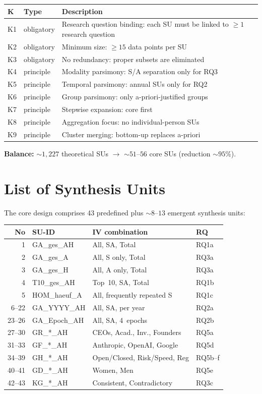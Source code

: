 \documentclass[12pt,a4paper]{article}
\begin{document}
\begin{longtable}{l l p{8cm}}
  \toprule
  \textbf{K} & \textbf{Type} & \textbf{Description} \\
  \midrule
  \endfirsthead
  K1 & obligatory & Research question binding: each SU must be linked to $\geq 1$ research question \\
  K2 & obligatory & Minimum size: $\geq 15$ data points per SU \\
  K3 & obligatory & No redundancy: proper subsets are eliminated \\
  K4 & principle & Modality parsimony: S/A separation only for RQ3 \\
  K5 & principle & Temporal parsimony: annual SUs only for RQ2 \\
  K6 & principle & Group parsimony: only a-priori-justified groups \\
  K7 & principle & Stepwise expansion: core first \\
  K8 & principle & Aggregation focus: no individual-person SUs \\
  K9 & principle & Cluster merging: bottom-up replaces a-priori \\
  \bottomrule
\end{longtable}

\textbf{Balance:} ${\sim}1{,}227$ theoretical SUs $\to$ ${\sim}51$--$56$ core SUs (reduction ${\sim}95$\%).


\section{List of Synthesis Units}
\label{app:se}

The core design comprises 43 predefined plus ${\sim}8$--$13$ emergent synthesis units:

{\small
\begin{longtable}{r l l l}
  \toprule
  \textbf{No} & \textbf{SU-ID} & \textbf{IV combination} & \textbf{RQ} \\
  \midrule
  \endfirsthead
  1 & GA\_ges\_AH & All, SA, Total & RQ1a \\
  2 & GA\_ges\_A & All, S only, Total & RQ3a \\
  3 & GA\_ges\_H & All, A only, Total & RQ3a \\
  4 & T10\_ges\_AH & Top~10, SA, Total & RQ1b \\
  5 & HOM\_haeuf\_A & All, frequently repeated S & RQ1c \\
  6--22 & GA\_YYYY\_AH & All, SA, per year & RQ2a \\
  23--26 & GA\_Epoch\_AH & All, SA, 4~epochs & RQ2b \\
  27--30 & GR\_*\_AH & CEOs, Acad., Inv., Founders & RQ5a \\
  31--33 & GF\_*\_AH & Anthropic, OpenAI, Google & RQ5d \\
  34--39 & GH\_*\_AH & Open/Closed, Risk/Speed, Reg & RQ5b--f \\
  40--41 & GD\_*\_AH & Women, Men & RQ5e \\
  42--43 & KG\_*\_AH & Consistent, Contradictory & RQ3c \\
  \bottomrule
\end{longtable}
}
\end{document}
